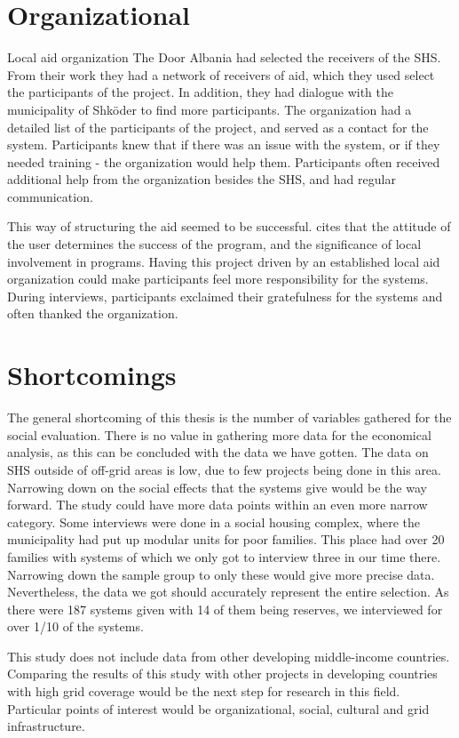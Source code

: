 \section{Organizational}
Local aid organization The Door Albania had selected the receivers of the SHS. From their work they had a network of receivers of aid, which they used select the participants of the project. In addition, they had dialogue with the municipality of Shköder to find more participants. The organization had a detailed list of the participants of the project, and served as a contact for the system. Participants knew that if there was an issue with the system, or if they needed training - the organization would help them. Participants often received additional help from the organization besides the SHS, and had regular communication. 

This way of structuring the aid seemed to be successful. \citep{chaureyAssessmentEvaluationPV2010} cites that the attitude of the user determines the success of the program, and the significance of local involvement in programs. Having this project driven by an established local aid organization could make participants feel more responsibility for the systems. During interviews, participants exclaimed their gratefulness for the systems and often thanked the organization. 

\section{Shortcomings}
The general shortcoming of this thesis is the number of variables gathered for the social evaluation. There is no value in gathering more data for the economical analysis, as this can be concluded with the data we have gotten. The data on SHS outside of off-grid areas is low, due to few projects being done in this area. Narrowing down on the social effects that the systems give would be the way forward. The study could have more data points within an even more narrow category. Some interviews were done in a social housing complex, where the municipality had put up modular units for poor families. This place had over 20 families with systems of which we only got to interview three in our time there. Narrowing down the sample group to only these would give more precise data. Nevertheless, the data we got should accurately represent the entire selection. As there were 187 systems given with 14 of them being reserves, we interviewed for over 1/10 of the systems. 

This study does not include data from other developing middle-income countries. Comparing the results of this study with other projects in developing countries with high grid coverage would be the next step for research in this field. Particular points of interest would be organizational, social, cultural and grid infrastructure. 
